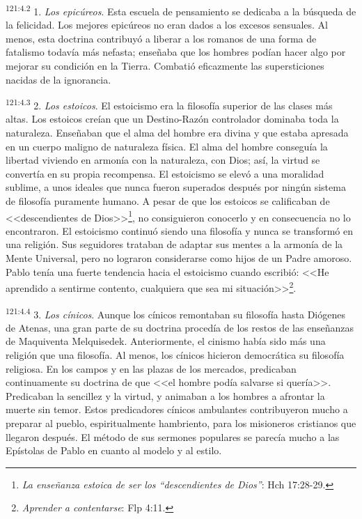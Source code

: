 \par 
\textsuperscript{121:4.2} 1. \textit{Los epicúreos}. Esta escuela de pensamiento se dedicaba a la búsqueda de la felicidad. Los mejores epicúreos no eran dados a los excesos sensuales. Al menos, esta doctrina contribuyó a liberar a los romanos de una forma de fatalismo todavía más nefasta; enseñaba que los hombres podían hacer algo por mejorar su condición en la Tierra. Combatió eficazmente las supersticiones nacidas de la ignorancia.

\par 
\textsuperscript{121:4.3} 2. \textit{Los estoicos}. El estoicismo era la filosofía superior de las clases más altas. Los estoicos creían que un Destino-Razón controlador dominaba toda la naturaleza. Enseñaban que el alma del hombre era divina y que estaba apresada en un cuerpo maligno de naturaleza física. El alma del hombre conseguía la libertad viviendo en armonía con la naturaleza, con Dios; así, la virtud se convertía en su propia recompensa. El estoicismo se elevó a una moralidad sublime, a unos ideales que nunca fueron superados después por ningún sistema de filosofía puramente humano. A pesar de que los estoicos se calificaban de <<descendientes de Dios>>\footnote{\textit{La enseñanza estoica de ser los ``descendientes de Dios''}: Hch 17:28-29.}, no consiguieron conocerlo y en consecuencia no lo encontraron. El estoicismo continuó siendo una filosofía y nunca se transformó en una religión. Sus seguidores trataban de adaptar sus mentes a la armonía de la Mente Universal, pero no lograron considerarse como hijos de un Padre amoroso. Pablo tenía una fuerte tendencia hacia el estoicismo cuando escribió: <<He aprendido a sentirme contento, cualquiera que sea mi situación>>\footnote{\textit{Aprender a contentarse}: Flp 4:11.}.

\par 
\textsuperscript{121:4.4} 3. \textit{Los cínicos}. Aunque los cínicos remontaban su filosofía hasta Diógenes de Atenas, una gran parte de su doctrina procedía de los restos de las enseñanzas de Maquiventa Melquisedek. Anteriormente, el cinismo había sido más una religión que una filosofía. Al menos, los cínicos hicieron democrática su filosofía religiosa. En los campos y en las plazas de los mercados, predicaban continuamente su doctrina de que <<el hombre podía salvarse si quería>>. Predicaban la sencillez y la virtud, y animaban a los hombres a afrontar la muerte sin temor. Estos predicadores cínicos ambulantes contribuyeron mucho a preparar al pueblo, espiritualmente hambriento, para los misioneros cristianos que llegaron después. El método de sus sermones populares se parecía mucho a las Epístolas de Pablo en cuanto al modelo y al estilo.

